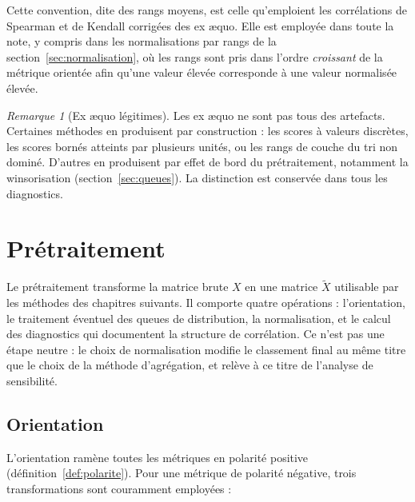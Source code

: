 \documentclass[11pt,a4paper]{article}
\theoremstyle{definition}
\theoremstyle{remark}
\newtheorem{remarque}{Remarque}[section]
\begin{document}
\bigskip

Cette convention, dite des rangs moyens, est celle qu'emploient les corrélations de
Spearman et de Kendall corrigées des ex \ae quo. Elle est employée dans toute la note, y
compris dans les normalisations par rangs de la section~\ref{sec:normalisation}, où les
rangs sont pris dans l'ordre \emph{croissant} de la métrique orientée afin qu'une valeur
élevée corresponde à une valeur normalisée élevée.

\medskip

\begin{remarque}[Ex \ae quo légitimes]
  \label{rem:exaequo}
  Les ex \ae quo ne sont pas tous des artefacts. Certaines méthodes en produisent par
  construction : les scores à valeurs discrètes, les scores bornés atteints par plusieurs
  unités, ou les rangs de couche du tri non dominé. D'autres en produisent par effet de
  bord du prétraitement, notamment la winsorisation
  (section~\ref{sec:queues}). La distinction est conservée dans tous les diagnostics.
\end{remarque}

\section{Prétraitement}
\label{sec:pretraitement}

\medskip

Le prétraitement transforme la matrice brute $X$ en une matrice $\tilde{X}$ utilisable par
les méthodes des chapitres suivants. Il comporte quatre opérations : l'orientation, le
traitement éventuel des queues de distribution, la normalisation, et le calcul des
diagnostics qui documentent la structure de corrélation. Ce n'est pas une étape neutre :
le choix de normalisation modifie le classement final au même titre que le choix de la
méthode d'agrégation, et relève à ce titre de l'analyse de sensibilité.

\bigskip

\subsection{Orientation}
\label{sec:orientation}

\medskip

L'orientation ramène toutes les métriques en polarité positive
(définition~\ref{def:polarite}). Pour une métrique de polarité négative, trois
transformations sont couramment employées :
\end{document}
